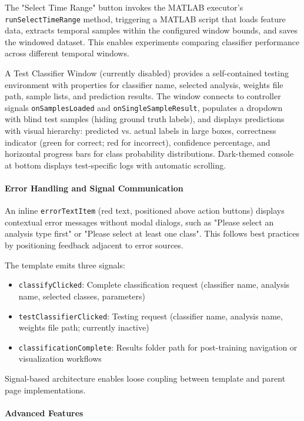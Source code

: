 \documentclass[12pt]{report}
\begin{document}
The "Select Time Range" button invokes the MATLAB executor's \verb|runSelectTimeRange| method, triggering a MATLAB script that loads feature data, extracts temporal samples within the configured window bounds, and saves the windowed dataset. This enables experiments comparing classifier performance across different temporal windows.

A Test Classifier Window (currently disabled) provides a self-contained testing environment with properties for classifier name, selected analysis, weights file path, sample lists, and prediction results. The window connects to controller signals \verb|onSamplesLoaded| and \verb|onSingleSampleResult|, populates a dropdown with blind test samples (hiding ground truth labels), and displays predictions with visual hierarchy: predicted vs. actual labels in large boxes, correctness indicator (green for correct; red for incorrect), confidence percentage, and horizontal progress bars for class probability distributions. Dark-themed console at bottom displays test-specific logs with automatic scrolling.

\paragraph{Error Handling and Signal Communication}\mbox{}

An inline \verb|errorTextItem| (red text, positioned above action buttons) displays contextual error messages without modal dialogs, such as "Please select an analysis type first" or "Please select at least one class". This follows best practices by positioning feedback adjacent to error sources.

The template emits three signals:
\begin{itemize}
\item \verb|classifyClicked|: Complete classification request (classifier name, analysis name, selected classes, parameters)
\item \verb|testClassifierClicked|: Testing request (classifier name, analysis name, weights file path; currently inactive)
\item \verb|classificationComplete|: Results folder path for post-training navigation or visualization workflows
\end{itemize}

Signal-based architecture enables loose coupling between template and parent page implementations.

\paragraph{Advanced Features}\mbox{}
\end{document}
